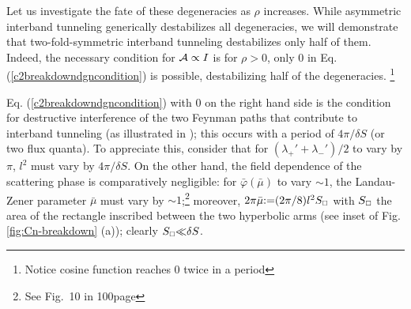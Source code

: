 \documentclass[aps, prb, showpacs, twocolumn, notitlepage, superscriptaddress]{revtex4-1}
\begin{document}


Let us investigate the fate of these degeneracies as $\rho$ increases. While asymmetric interband tunneling generically destabilizes all degeneracies, we will demonstrate that two-fold-symmetric interband tunneling destabilizes only half of them. Indeed, the necessary condition for ${\cal A}\propto I$ is 
for $\rho{>}0$, only 0 in Eq. (\ref{c2breakdowndgncondition}) is possible, destabilizing half of the degeneracies. \footnote{Notice cosine function reaches 0 twice in a period}

Eq. (\ref{c2breakdowndgncondition}) with $0$ on the right hand side is the condition for destructive interference of the two Feynman paths that contribute to interband tunneling (as illustrated in \red{[Fig]}); this occurs with a period  of   $4\pi /\delta S$ (or two flux quanta). To appreciate this, consider that  for $(\lambda_+'{+}\lambda_-')/2$ to vary by $\pi$, $l^2$ must vary by $4\pi/\delta S$. On the other hand, the field dependence of the scattering phase is comparatively negligible: for $\bar{\varphi}(\bar{\mu})$ to vary  $\sim 1$, the Landau-Zener parameter $\bar{\mu}$ must vary by $\sim 1$;\footnote{See Fig.\ 10 in 100page} moreover, $2\pi\bar{\mu}{:}{=} (2\pi/8) l^2S_{\scriptscriptstyle{\square}}$ with  $S_{\scriptscriptstyle{\square}}$ the area of the rectangle inscribed between the two hyperbolic arms  (see inset of Fig. \ref{fig:Cn-breakdown} (a)); clearly $S_{\scriptscriptstyle{\square}}{\ll}\delta S$.








\end{document}

